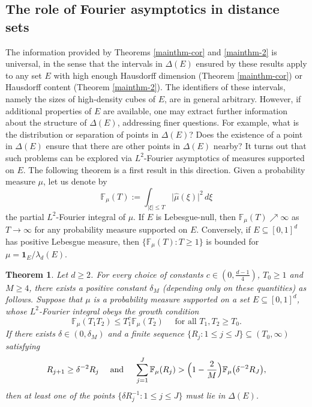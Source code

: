 \documentclass[a4paper,11pt]{amsart}
\newtheorem{thm}{\bf Theorem}[section]
\numberwithin{equation}{section}
\begin{document}
\subsection{The role of Fourier asymptotics in distance sets} \label{Fourier-asymptotics-section}
The information provided by Theorems \ref{mainthm-cor} and \ref{mainthm-2} is universal, in the sense that the intervals in $\Delta(E)$ ensured by these results apply to any set $E$ with high enough Hausdorff dimension (Theorem \ref{mainthm-cor}) or Hausdorff content (Theorem \ref{mainthm-2}). The identifiers of these intervals, namely the sizes of high-density cubes of $E$, are in general arbitrary. However, if additional properties of $E$ are available, one may extract further information about the structure of $\Delta(E)$, addressing finer questions. For example, what is the distribution or separation of points in $\Delta(E)$?  Does the existence of a point in $\Delta(E)$ ensure that there are other points in $\Delta(E)$ nearby? It turns out that such problems can be explored via $L^2$-Fourier asymptotics of measures supported on $E$. The following theorem is a first result in this direction.
\vskip0.1in
\noindent Given a probability measure $\mu$, let us denote by 
\begin{equation} \label{def-F}
\mathbb F_{\mu}(T) := \int_{|\xi| \leq T} \bigl| \widehat{\mu}(\xi) \bigr|^2 \, d\xi
\end{equation} 
the partial $L^2$-Fourier integral of $\mu$. If $E$ is Lebesgue-null, then $\mathbb F_{\mu}(T) \nearrow \infty$ as $T \rightarrow \infty$ for any probability measure supported on $E$. Conversely, if $E \subseteq [0,1]^d$ has positive Lebesgue measure, then $\{ \mathbb F_{\mu}(T) : T \geq 1\}$ is bounded for $\mu = \mathbf 1_E/\lambda_d(E)$. 
\begin{thm} \label{F-asymptotics-thm}
Let $d \geq 2$. For every choice of constants $c \in (0, \frac{d-1}{4})$, $T_0 \geq 1$ and $M \geq 4$, there exists a positive constant $\delta_M$ (depending only on these quantities) as follows. 
\vskip0.1in 
\noindent Suppose that $\mu$ is a probability measure supported on a set $E \subseteq [0,1]^d$, whose $L^2$-Fourier integral obeys the growth condition  
\begin{equation}\label{controlled-growth}  
\mathbb F_{\mu}(T_1T_2) \leq T_1^c \mathbb F_{\mu}(T_2) \quad \text{ for all } T_1, T_2 \geq T_0.  
\end{equation} 
If there exists $\delta \in (0, \delta_M)$ and a finite sequence $\{R_j: 1 \leq j \leq J\} \subseteq (T_0, \infty)$ satisfying  
\begin{equation} \label{Rj-condition} 
R_{j+1} \geq \delta^{-2} R_j \quad \text{ and } \quad \sum_{j=1}^{J} \mathbb F_{\mu}(R_j) > \Bigl(1 - \frac2M \Bigr)  \mathbb F_{\mu}\bigl(\delta^{-2} R_J \bigr),
\end{equation}  
then at least one of the points $\{\delta R_j^{-1} : 1 \leq j \leq J \}$ must lie in $\Delta(E)$. 
\end{thm}  
\end{document}
